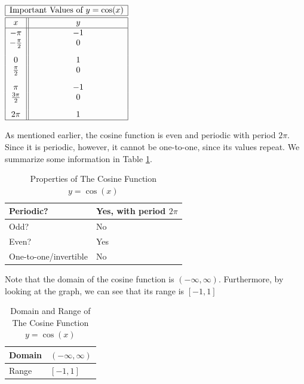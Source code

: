 \documentclass[nooutcomes]{ximera}
\begin{document}
\begin{center}
\(
\begin{array}{ |c || c|  }
 \hline
 \multicolumn{2}{|c|}{\text{\normalfont Important Values of } y=\cos(x)} \\
\hline
 \hline
 x & y\\
 \hline

 -\pi&-1\\

 -\frac{\pi}{2}&0\\[2ex]

 0&1\\

 \frac{\pi}{2}&0\\[2ex]

 \pi&-1\\

\frac{3\pi}{2}&0\\[2ex]

 2 \pi&1\\
\hline
\end{array}
\)
\end{center} 

As mentioned earlier, the cosine function is even and periodic with period $2\pi$. Since it is periodic, however, it cannot be one-to-one, since its values repeat. We summarize some information in Table \ref{tab:cosineproperties}.

\begin{table}[h]
\caption{\label{tab:cosineproperties}Properties of The Cosine Function $y = \cos(x)$}
\centering
\begin{tabular}{l|l}
Periodic? & Yes, with period $2\pi$ \\ \hline
Odd? &  No \\ \hline
Even? & Yes \\ \hline
One-to-one/invertible & No
\end{tabular}
\end{table}

Note that the domain of the cosine function is $(-\infty, \infty)$. Furthermore, by looking at the graph, we can see that its range is $[-1, 1]$

\begin{table}[h]
\caption{\label{tab:cosinedr}Domain and Range of The Cosine Function $y = \cos(x)$}
\centering
\begin{tabular}{l|l}
Domain & $(-\infty, \infty)$ \\ \hline
Range & $[-1, 1]$
\end{tabular}
\end{table}
\end{document}
